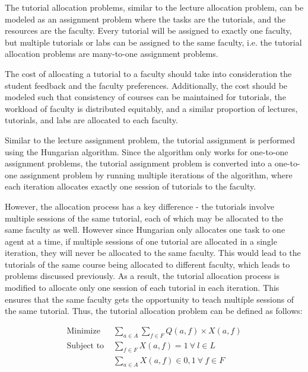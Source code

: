 The tutorial allocation problems, similar to the lecture allocation problem, can be modeled as an assignment problem where the tasks are the tutorials, and the resources are the faculty. Every tutorial will be assigned to exactly one faculty, but multiple tutorials or labs can be assigned to the same faculty, i.e. the tutorial allocation problems are many-to-one assignment problems.

The cost of allocating a tutorial to a faculty should take into consideration the student feedback and the faculty preferences. Additionally, the cost should be modeled such that consistency of courses can be maintained for tutorials, the workload of faculty is distributed equitably, and a similar proportion of lectures, tutorials, and labs are allocated to each faculty.

Similar to the lecture assignment problem, the tutorial assignment is performed using the Hungarian algorithm. Since the algorithm only works for one-to-one assignment problems, the tutorial assignment problem is converted into a one-to-one assignment problem by running multiple iterations of the algorithm, where each iteration allocates exactly one session of tutorials to the faculty.

However, the allocation process has a key difference - the tutorials involve multiple sessions of the same tutorial, each of which may be allocated to the same faculty as well. However since Hungarian only allocates one task to one agent at a time, if multiple sessions of one tutorial are allocated in a single iteration, they will never be allocated to the same faculty. This would lead to the tutorials of the same course being allocated to different faculty, which leads to problems discussed previously. As a result, the tutorial allocation process is modified to allocate only one session of each tutorial in each iteration. This ensures that the same faculty gets the opportunity to teach multiple sessions of the same tutorial. Thus, the tutorial allocation problem can be defined as follows:

\begin{equation}
  \begin{aligned}
    \text{Minimize }   & \sum_{a \in A} \sum_{f \in F} Q(a, f) \times X(a, f)  \\
    \text{Subject to } & \sum_{f \in F} X(a, f) = 1 \ \forall\  l \in L        \\
                       & \sum_{a \in A} X(a, f) \in {0, 1} \ \forall\  f \in F
  \end{aligned}
\end{equation}

